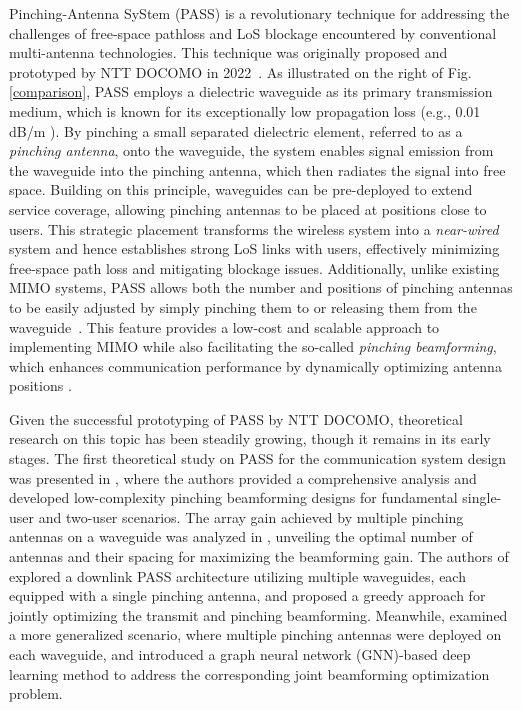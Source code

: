 Pinching-Antenna SyStem (PASS) is a revolutionary technique for addressing the challenges of free-space pathloss and LoS blockage encountered by conventional multi-antenna technologies. This technique was originally proposed and prototyped by NTT DOCOMO in 2022~\cite{suzuki2022pinching}. As illustrated on the right of Fig. \ref{comparison}, PASS employs a dielectric waveguide as its primary transmission medium, which is known for its exceptionally low propagation loss (e.g., 0.01 dB/m \cite{pozar2021microwave}). By pinching a small separated dielectric element, referred to as a \emph{pinching antenna}, onto the waveguide, the system enables signal emission from the waveguide into the pinching antenna, which then radiates the signal into free space. Building on this principle, waveguides can be pre-deployed to extend service coverage, allowing pinching antennas to be placed at positions close to users. This strategic placement transforms the wireless system into a \emph{near-wired} system and hence establishes strong LoS links with users, effectively minimizing free-space path loss and mitigating blockage issues. Additionally, unlike existing MIMO systems, PASS allows both the number and positions of pinching antennas to be easily adjusted by simply pinching them to or releasing them from the waveguide~\cite{suzuki2022pinching}. This feature provides a low-cost and scalable approach to implementing MIMO while also facilitating the so-called \emph{pinching beamforming}, which enhances communication performance by dynamically optimizing antenna positions \cite{liu2025pinching}.

Given the successful prototyping of PASS by NTT DOCOMO, theoretical research on this topic has been steadily growing, though it remains in its early stages. The first theoretical study on PASS for the communication system design was presented in \cite{ding2024flexible}, where the authors provided a comprehensive analysis and developed low-complexity pinching beamforming designs for fundamental single-user and two-user scenarios. The array gain achieved by multiple pinching antennas on a waveguide was analyzed in \cite{ouyang2025array}, unveiling the optimal number of antennas and their spacing for maximizing the beamforming gain. 
The authors of \cite{bereyhi2025downlink} explored a downlink PASS architecture utilizing multiple waveguides, each equipped with a single pinching antenna, and proposed a greedy approach for jointly optimizing the transmit and pinching beamforming. Meanwhile, \cite{guo2025deep} examined a more generalized scenario, where multiple pinching antennas were deployed on each waveguide, and introduced a graph neural network (GNN)-based deep learning method to address the corresponding joint beamforming optimization problem.

